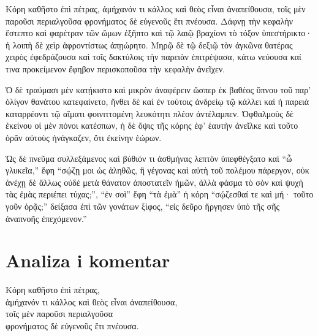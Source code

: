 \begin{greek}
{\large
{ \noindent Κόρη καθῆστο ἐπὶ πέτρας, ἀμήχανόν τι κάλλος καὶ θεὸς εἶναι ἀναπείθουσα, τοῖς μὲν παροῦσι περιαλγοῦσα φρονήματος δὲ εὐγενοῦς ἔτι πνέουσα.  Δάφνῃ τὴν κεφαλὴν ἔστεπτο καὶ φαρέτραν τῶν ὤμων ἐξῆπτο καὶ τῷ λαιῷ βραχίονι τὸ τόξον ὑπεστήρικτο· ἡ λοιπὴ δὲ χεὶρ ἀφροντίστως ἀπῃώρητο. Μηρῷ δὲ τῷ δεξιῷ τὸν ἀγκῶνα θατέρας χειρὸς ἐφεδράζουσα καὶ τοῖς δακτύλοις τὴν παρειὰν ἐπιτρέψασα, κάτω νεύουσα καί τινα προκείμενον ἔφηβον περισκοποῦσα τὴν κεφαλὴν ἀνεῖχεν.  

Ὁ δὲ τραύμασι μὲν κατῄκιστο καὶ μικρὸν ἀναφέρειν ὥσπερ ἐκ βαθέος ὕπνου τοῦ παρ' ὀλίγον θανάτου κατεφαίνετο, ἤνθει δὲ καὶ ἐν τούτοις ἀνδρείῳ τῷ κάλλει καὶ ἡ παρειὰ καταρρέοντι τῷ αἵματι φοινιττομένη λευκότητι πλέον ἀντέλαμπεν. Ὀφθαλμοὺς δὲ ἐκείνου οἱ μὲν πόνοι κατέσπων, ἡ δὲ ὄψις τῆς κόρης ἐφ' ἑαυτὴν ἀνεῖλκε καὶ τοῦτο ὁρᾶν αὐτοὺς ἠνάγκαζεν, ὅτι ἐκείνην ἑώρων.  

Ὡς δὲ πνεῦμα συλλεξάμενος καὶ βύθιόν τι ἀσθμήνας λεπτὸν ὑπεφθέγξατο καὶ ``ὦ γλυκεῖα,'' ἔφη ``σῴζῃ μοι ὡς ἀληθῶς, ἢ γέγονας καὶ αὐτὴ τοῦ πολέμου πάρεργον, οὐκ ἀνέχῃ δὲ ἄλλως οὐδὲ μετὰ θάνατον ἀποστατεῖν ἡμῶν, ἀλλὰ φάσμα τὸ σὸν καὶ ψυχὴ τὰς ἐμὰς περιέπει τύχας;'', ``ἐν σοὶ'' ἔφη ``τὰ ἐμὰ'' ἡ κόρη ``σῴζεσθαί τε καὶ μή· τοῦτο γοῦν ὁρᾷς;'' δείξασα ἐπὶ τῶν γονάτων ξίφος, ``εἰς δεῦρο ἤργησεν ὑπὸ τῆς σῆς ἀναπνοῆς ἐπεχόμενον.''

}
}
\end{greek}

\section*{Analiza i komentar}


{\large
\begin{greek}
\noindent Κόρη καθῆστο ἐπὶ πέτρας, \\
ἀμήχανόν τι κάλλος καὶ θεὸς εἶναι ἀναπείθουσα, \\
τοῖς μὲν παροῦσι περιαλγοῦσα \\
φρονήματος δὲ εὐγενοῦς ἔτι πνέουσα.\\

\end{greek}
}

